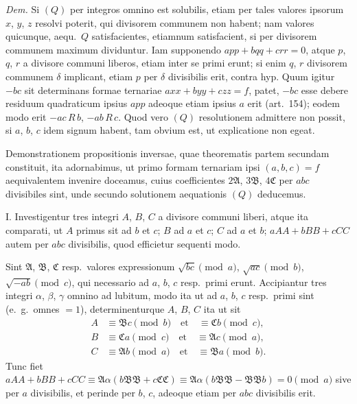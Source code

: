 \documentclass[12pt,a4paper]{article}
\theoremstyle{plain}
\theoremstyle{definition}
\theoremstyle{remark}
\begin{document}
\textit{Dem.} Si $(Q)$ per integros omnino est solubilis, etiam per tales valores ipsorum $x$, $y$, $z$ resolvi poterit, qui divisorem communem non habent; nam valores quicunque, aequ.~$Q$ satisfacientes, etiamnum satisfacient, si per divisorem communem maximum dividuntur. Iam supponendo $app + bqq + crr = 0$, atque $p$, $q$, $r$ a divisore communi liberos, etiam inter se primi erunt; si enim $q$, $r$ divisorem communem $\delta$ implicant, etiam $p$ per $\delta$ divisibilis erit, contra hyp. Quum igitur $-bc$ sit determinans formae ternariae $axx + byy + czz = f$, patet, $-bc$ esse debere residuum quadraticum ipsius $app$ adeoque etiam ipsius $a$ erit (art.~154); eodem modo erit $-ac \, R \, b$, $-ab \, R \, c$. Quod vero $(Q)$ resolutionem admittere non possit, si $a$, $b$, $c$ idem signum habent, tam obvium est, ut explicatione non egeat.

Demonstrationem propositionis inversae, quae theorematis partem secundam constituit, ita adornabimus, ut primo formam ternariam ipsi $(a,b,c) = f$ aequivalentem invenire doceamus, cuius coefficientes $2\mathfrak{A}$, $3\mathfrak{B}$, $4\mathfrak{C}$ per $abc$ divisibiles sint, unde secundo solutionem aequationis $(Q)$ deducemus.

\textsc{I.} Investigentur tres integri $A$, $B$, $C$ a divisore communi liberi, atque ita comparati, ut $A$ primus sit ad $b$ et $c$; $B$ ad $a$ et $c$; $C$ ad $a$ et $b$; $aAA + bBB + cCC$ autem per $abc$ divisibilis, quod efficietur sequenti modo.

Sint $\mathfrak{A}$, $\mathfrak{B}$, $\mathfrak{C}$ resp.~valores expressionum $\surd{bc}\pmod{a}$, $\surd{ac}\pmod{b}$, $\surd{-ab}\pmod{c}$, qui necessario ad $a$, $b$, $c$ resp.~primi erunt. Accipiantur tres integri $\alpha$, $\beta$, $\gamma$ omnino ad lubitum, modo ita ut ad $a$, $b$, $c$ resp.~primi sint (e.~g.~omnes $= 1$), determinenturque $A$, $B$, $C$ ita ut sit
\begin{align*}
A &\equiv \mathfrak{B}c \pmod{b} \quad\text{et}\quad \equiv \mathfrak{C}b \pmod{c}, \\
B &\equiv \mathfrak{C}a \pmod{c} \quad\text{et}\quad \equiv \mathfrak{A}c \pmod{a}, \\
C &\equiv \mathfrak{A}b \pmod{a} \quad\text{et}\quad \equiv \mathfrak{B}a \pmod{b}.
\end{align*}
Tunc fiet $aAA + bBB + cCC \equiv \mathfrak{A}\alpha(b\mathfrak{B}\mathfrak{B} + c\mathfrak{C}\mathfrak{C}) \equiv \mathfrak{A}\alpha(b\mathfrak{B}\mathfrak{B} - \mathfrak{B}\mathfrak{B}b) = 0 \pmod{a}$ sive per $a$ divisibilis, et perinde per $b$, $c$, adeoque etiam per $abc$ divisibilis erit.
\end{document}

